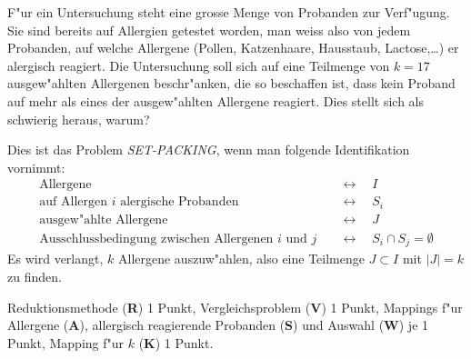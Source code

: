 F"ur ein Untersuchung steht eine grosse Menge von Probanden zur Verf"ugung.
Sie sind bereits auf Allergien getestet worden, man weiss also von jedem
Probanden, auf welche Allergene (Pollen, Katzenhaare, Hausstaub, Lactose,\dots)
er alergisch reagiert.
Die Untersuchung soll sich auf eine Teilmenge von $k=17$ ausgew"ahlten
Allergenen beschr"anken, die so beschaffen ist, dass kein Proband auf mehr als 
eines der ausgew"ahlten Allergene reagiert.
Dies stellt sich als schwierig heraus, warum?

\begin{loesung}
Dies ist das Problem {\em SET-PACKING}, wenn man folgende Identifikation
vornimmt:
\begin{align*}
\text{Allergene}                           &\quad\leftrightarrow\quad I\\
\text{auf Allergen $i$ alergische Probanden}&\quad\leftrightarrow\quad S_i\\
\text{ausgew"ahlte Allergene}              &\quad\leftrightarrow\quad J\\
\text{Ausschlussbedingung zwischen Allergenen $i$ und $j$}&\quad\leftrightarrow\quad S_i\cap S_j = \emptyset
\end{align*}
Es wird verlangt, $k$ Allergene auszuw"ahlen, also eine Teilmenge
$J\subset I$ mit $|J|=k$ zu finden.
\end{loesung}

\begin{bewertung}
Reduktionsmethode ({\bf R}) 1 Punkt,
Vergleichsproblem ({\bf V}) 1 Punkt,
Mappings f"ur Allergene ({\bf A}), allergisch reagierende Probanden ({\bf S})
und Auswahl ({\bf W}) je 1 Punkt,
Mapping f"ur $k$ ({\bf K}) 1 Punkt.
\end{bewertung}

